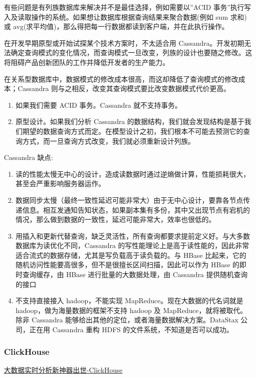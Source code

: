 \documentclass[hyperref, UTF-8]{ctexart}
\begin{document}
有些问题是有列族数据库来解决并不是最佳选择，例如需要以”ACID 事务”执行写入及读取操作的系统。如果想让数据库根据查询结果来聚合数据(例如 sum 求和)或 avg(求平均值)，那么得把每一行数据都读到客户端，并在此执行操作。

在开发早期原型或开始试探某个技术方案时，不太适合用 Cassandra。开发初期无法确定查询模式的变化情况，而查询模式一旦改变，列族的设计也要随之修改。这将阻碍产品创新团队的工作并降低开发者的生产能力。

在关系型数据库中，数据模式的修改成本很高，而这却降低了查询模式的修改成本；Cassandra 则与之相反，改变其查询模式要比改变数据模式代价更高。

\begin{enumerate}
\item 如果我们需要 ACID 事务。Cassandra 就不支持事务。

\item 原型设计。如果我们分析 Cassandra 的数据结构，我们就会发现结构是基于我们期望的数据查询方式而定。在模型设计之初，我们根本不可能去预测它的查询方式，而一旦查询方式改变，我们就必须重新设计列族。
\end{enumerate}
Cassandra 缺点:
\begin{enumerate}
\item 读的性能太慢无中心的设计，造成读数据时通过逆熵做计算，性能损耗很大，甚至会严重影响服务器运作。
\item 数据同步太慢（最终一致性延迟可能非常大）由于无中心设计，要靠各节点传递信息。相互发通知告知状态，如果副本集有多份，其中又出现节点有宕机的情况，那么做到数据的一致性，延迟可能非常大，效率也很低的。
\item 用插入和更新代替查询，缺乏灵活性，所有查询都要求提前定义好。与大多数数据库为读优化不同，Cassandra 的写性能理论上是高于读性能的，因此非常适合流式的数据存储，尤其是写负载高于读负载的。与 HBase 比起来，它的随机访问性能要高很多，但不是很擅长区间扫描，因此可以作为 HBase 的即时查询缓存，由 HBase 进行批量的大数据处理，由 Cassandra 提供随机查询的接口
\item 不支持直接接入 hadoop，不能实现 MapReduce。现在大数据的代名词就是 hadoop，做为海量数据的框架不支持 hadoop 及 MapReduce，就将被取代。除非 Cassandra 能够给出其他的定位，或者海量数据解决方案。DataStax 公司，正在用 Cassandra 重构 HDFS 的文件系统，不知道是否可以成功。
\end{enumerate}
\subsubsection{ClickHouse}
\label{sec:orgeefefc9}
\href{http://www.jianshu.com/p/4b7d652317bb?from=timeline}{大数据实时分析新神器出世-ClickHouse}   
\end{document}
